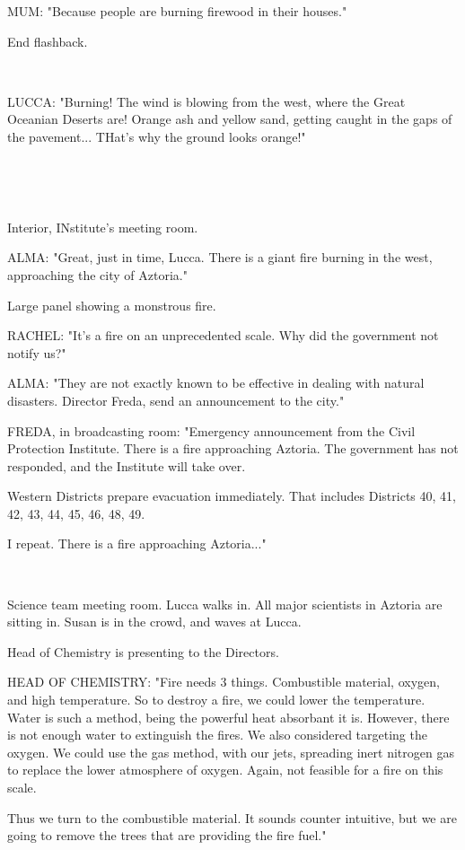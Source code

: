 \documentclass[11pt]{article}
\begin{document}
MUM: "Because people are burning firewood in their houses."

End flashback.

\ 

LUCCA: "Burning!
The wind is blowing from the west, where the Great Oceanian Deserts are! 
Orange ash and yellow sand, getting caught in the gaps of the pavement...
THat's why the ground looks orange!"

\ 

\ 

Interior, INstitute's meeting room.

ALMA: "Great, just in time, Lucca. 
There is a giant fire burning in the west, approaching the city of Aztoria."

Large panel showing a monstrous fire.

RACHEL: "It's a fire on an unprecedented scale. Why did the government not notify us?"

ALMA: "They are not exactly known to be effective in dealing with natural disasters. Director Freda, send an announcement to the city."

FREDA, in broadcasting room: "Emergency announcement from the Civil Protection Institute. 
There is a fire approaching Aztoria.
The government has not responded, and the Institute will take over.

Western Districts prepare evacuation immediately. 
That includes Districts 40, 41, 42, 43, 44, 45, 46, 48, 49.

I repeat. 
There is a fire approaching Aztoria..."

\ 

Science team meeting room. 
Lucca walks in.
All major scientists in Aztoria are sitting in. 
Susan is in the crowd, and waves at Lucca.

Head of Chemistry is presenting to the Directors.

HEAD OF CHEMISTRY: "Fire needs 3 things.
Combustible material, oxygen, and high temperature.
So to destroy a fire, we could lower the temperature.
Water is such a method, being the powerful heat absorbant it is.
However, there is not enough water to extinguish the fires.
We also considered targeting the oxygen.
We could use the gas method, with our jets, spreading inert nitrogen gas to replace the lower atmosphere of oxygen.
Again, not feasible for a fire on this scale.

Thus we turn to the combustible material.
It sounds counter intuitive, but we are going to remove the trees that are providing the fire fuel."
\end{document}
